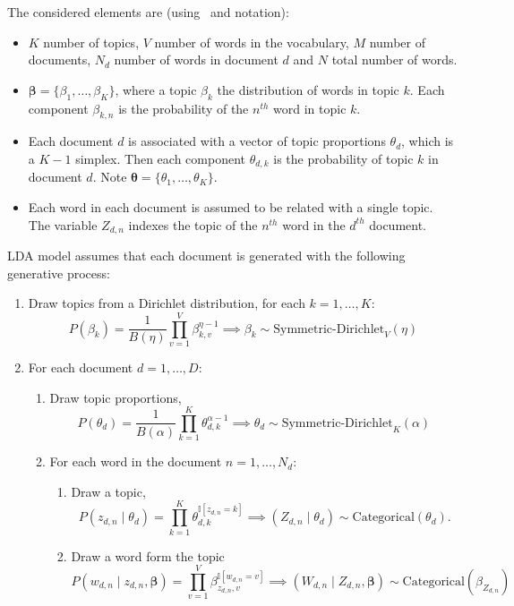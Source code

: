 The considered elements are (using~\cite{hoffman2013stochastic} and \cite{blei2003latent} notation):
\begin{itemize}\setlength\itemsep{1em}
  \item \(K\) number of topics, \(V\) number of words in the vocabulary, \(M\) number of documents, \(N_{d}\) number of words in document \(d\) and \(N\) total number of words.
  \item \(\bm{\beta} = \{\beta_{1}, \dots, \beta_{K}\}\), where a topic \(\beta_{k}\) the distribution of words in topic \(k\). Each component \(\beta_{k,n}\) is the probability of the \(n^{th}\) word in topic \(k\).

  \item Each document \(d\) is associated with a vector of topic proportions \(\theta_{d}\), which is a \(K-1\) simplex. Then each component \(\theta_{d,k}\) is the probability of topic \(k\) in document \(d\). Note \(\bm{\theta} = \{\theta_{1},\dots,\theta_{K}\}\).
  \item Each word in each document is assumed to be related with a single topic. The variable \(Z_{d,n}\) indexes the topic of the \(n^{th}\) word in the \(d^{th}\) document.
\end{itemize}

LDA model assumes that each document is generated with the following generative process:
\begin{enumerate}
  \item Draw topics from a Dirichlet distribution, for each \(k=1,\dots,K\):
    \[
    P(\beta_{k}) = \frac{1}{B(\eta)} \prod_{v=1}^{V}\beta_{k,v}^{\eta - 1} \implies \beta_{k} \sim \text{Symmetric-Dirichlet}_{V}(\eta)
    \]
  \item For each document \(d = 1,\dots,D\):
    \begin{enumerate}
      \item Draw topic proportions,
        \[
        P(\theta_{d}) = \frac{1}{B(\alpha)} \prod_{k=1}^{K}\theta_{d,k}^{\alpha-1} \implies \theta_{d} \sim \text{Symmetric-Dirichlet}_{K}(\alpha)
        \]
      \item For each word in the document \(n = 1,\dots,N_{d}\):
        \begin{enumerate}
          \item Draw  a topic,
            \[
            P(z_{d,n} \mid \theta_{d}) = \prod_{k=1}^{K}\theta_{d,k}^{\mathbb{I}[z_{d,n}=k]} \implies  (Z_{d,n} \mid \theta_{d}) \sim \text{Categorical}(\theta_d).
            \]
          \item Draw a word form the topic
            \[
            P(w_{d,n}\mid z_{d,n}, \bm{\beta}) = \prod_{v=1}^{V}\beta_{z_{d,n},v}^{\mathbb{I}[w_{d,n}=v]} \implies (W_{d,n} \mid Z_{d,n},\bm{\beta}) \sim \text{Categorical}(\beta_{Z_{d,n}})
            \]
        \end{enumerate}
    \end{enumerate}
\end{enumerate}

